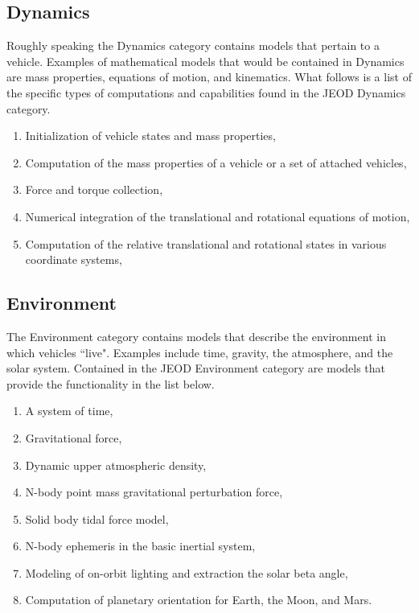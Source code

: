 \subsection{Dynamics}
Roughly speaking the Dynamics category contains models that pertain to a vehicle.  Examples of mathematical models that would be contained in Dynamics are mass properties, equations of motion, and kinematics.  What follows is a list of the specific types of computations and capabilities found in the JEOD Dynamics category.
\begin{enumerate}
\item Initialization of vehicle states and mass properties,
\item Computation of the mass properties of a vehicle or a set of attached vehicles,
\item Force and torque collection,
\item Numerical integration of the translational and rotational equations of motion,
\item Computation of the relative translational and rotational states in various coordinate systems,
\end{enumerate}

\subsection{Environment}
The Environment category contains models that describe the environment in which vehicles ``live".  Examples include time, gravity, the atmosphere, and the solar system.  Contained in the JEOD Environment category are models that provide the functionality in the list below.
\begin{enumerate}
\item A system of time,
\item Gravitational force,
\item Dynamic upper atmospheric density,
\item N-body point mass gravitational perturbation force,
\item Solid body tidal force model,
\item N-body ephemeris in the basic inertial system,
\item Modeling of on-orbit lighting and extraction the solar beta angle,
\item Computation of planetary orientation for Earth, the Moon, and Mars.
\end{enumerate}

